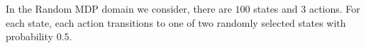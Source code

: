 
In the Random \ac{MDP} domain we consider, there are $100$ states and $3$ actions. For each state, each action transitions to one of two randomly selected states with probability $0.5$.



